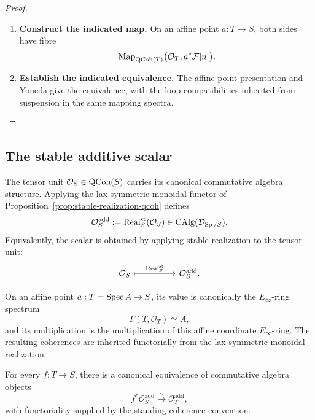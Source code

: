 \begin{proof}
\leavevmode
\begin{enumerate}[label=\textup{(\arabic*)}]
    \item \textbf{Construct the indicated map.}
    On an affine point \(a:T\to S\), both sides have fibre
    \[
    \operatorname{Map}_{\operatorname{QCoh}(T)}
    \bigl(\mathcal O_T,a^*\mathcal F[n]\bigr).
    \]
    \item \textbf{Establish the indicated equivalence.}
    The affine-point presentation and Yoneda give the equivalence, with the loop
    compatibilities inherited from suspension in the same mapping spectra.
\end{enumerate}
\end{proof}

\subsection{The stable additive scalar}
\label{sec:additive-scalar}

\begin{definition}
The tensor unit \(\mathcal O_S\in\operatorname{QCoh}(S)\) carries its canonical commutative
algebra structure. Applying the lax symmetric monoidal functor of
Proposition~\ref{prop:stable-realization-qcoh} defines
\[
  \mathcal O_S^{\mathrm{add}}
  :=
  \operatorname{Real}^{\mathrm{st}}_S(\mathcal O_S)
  \in
  \operatorname{CAlg}(\mathcal D_{\operatorname{Sp}/S}).
\]
Equivalently, the scalar is obtained by applying stable realization to the tensor
unit:
\[
\begin{tikzcd}[column sep=huge]
  \mathcal O_S \arrow[r,mapsto,"\operatorname{Real}^{\mathrm{st}}_S"]
  & \mathcal O_S^{\mathrm{add}}.
\end{tikzcd}
\]

On an affine point \(a:T=\operatorname{Spec} A\to S\), its value is canonically the
\(E_\infty\)-ring spectrum
\[
  \Gamma(T,\mathcal O_T)\simeq A,
\]
and its multiplication is the multiplication of this affine coordinate
\(E_\infty\)-ring. The resulting coherences are inherited functorially from the
lax symmetric monoidal realization.
\end{definition}

\begin{proposition}
\label{prop:additive-scalar-base-change}
For every \(f:T\to S\), there is a canonical equivalence of commutative algebra
objects
\[
  f^*\mathcal O_S^{\mathrm{add}}
  \xrightarrow{\simeq}
  \mathcal O_T^{\mathrm{add}},
\]
with functoriality supplied by the standing coherence convention.
\end{proposition}

